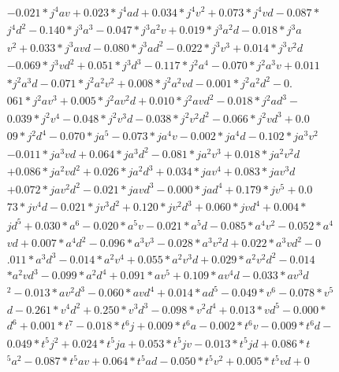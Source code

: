 \begin{align}
   -0.021 * j^4 a v + 0.023 * j^4 a d + 0.034 * j^4 v^2 + 0.073 * j^4 v d -0.087 * \\
   j^4 d^2 -0.140 * j^3 a^3 -0.047 * j^3 a^2 v + 0.019 * j^3 a^2 d -0.018 * j^3 a  \\
  v^2 + 0.033 * j^3 a v d -0.080 * j^3 a d^2 -0.022 * j^3 v^3 + 0.014 * j^3 v^2 d  \\
  -0.069 * j^3 v d^2 + 0.051 * j^3 d^3 -0.117 * j^2 a^4 -0.070 * j^2 a^3 v + 0.011 \\
   * j^2 a^3 d -0.071 * j^2 a^2 v^2 + 0.008 * j^2 a^2 v d -0.001 * j^2 a^2 d^2 -0. \\
  061 * j^2 a v^3 + 0.005 * j^2 a v^2 d + 0.010 * j^2 a v d^2 -0.018 * j^2 a d^3 - \\
  0.039 * j^2 v^4 -0.048 * j^2 v^3 d -0.038 * j^2 v^2 d^2 -0.066 * j^2 v d^3 + 0.0 \\
  09 * j^2 d^4 -0.070 * j a^5 -0.073 * j a^4 v -0.002 * j a^4 d -0.102 * j a^3 v^2 \\
   -0.011 * j a^3 v d + 0.064 * j a^3 d^2 -0.081 * j a^2 v^3 + 0.018 * j a^2 v^2 d \\
   + 0.086 * j a^2 v d^2 + 0.026 * j a^2 d^3 + 0.034 * j a v^4 + 0.083 * j a v^3 d \\
   + 0.072 * j a v^2 d^2 -0.021 * j a v d^3 -0.000 * j a d^4 + 0.179 * j v^5 + 0.0 \\
  73 * j v^4 d -0.021 * j v^3 d^2 + 0.120 * j v^2 d^3 + 0.060 * j v d^4 + 0.004 *  \\
  j d^5 + 0.030 * a^6 -0.020 * a^5 v -0.021 * a^5 d -0.085 * a^4 v^2 -0.052 * a^4  \\
  v d + 0.007 * a^4 d^2 -0.096 * a^3 v^3 -0.028 * a^3 v^2 d + 0.022 * a^3 v d^2 -0 \\
  .011 * a^3 d^3 -0.014 * a^2 v^4 + 0.055 * a^2 v^3 d + 0.029 * a^2 v^2 d^2 -0.014 \\
   * a^2 v d^3 -0.099 * a^2 d^4 + 0.091 * a v^5 + 0.109 * a v^4 d -0.033 * a v^3 d \\
  ^2 -0.013 * a v^2 d^3 -0.060 * a v d^4 + 0.014 * a d^5 -0.049 * v^6 -0.078 * v^5 \\
   d -0.261 * v^4 d^2 + 0.250 * v^3 d^3 -0.098 * v^2 d^4 + 0.013 * v d^5 -0.000 *  \\
  d^6 + 0.001 * t^7 -0.018 * t^6 j + 0.009 * t^6 a -0.002 * t^6 v -0.009 * t^6 d - \\
  0.049 * t^5 j^2 + 0.024 * t^5 j a + 0.053 * t^5 j v -0.013 * t^5 j d + 0.086 * t \\
  ^5 a^2 -0.087 * t^5 a v + 0.064 * t^5 a d -0.050 * t^5 v^2 + 0.005 * t^5 v d + 0 \\

\end{align}

